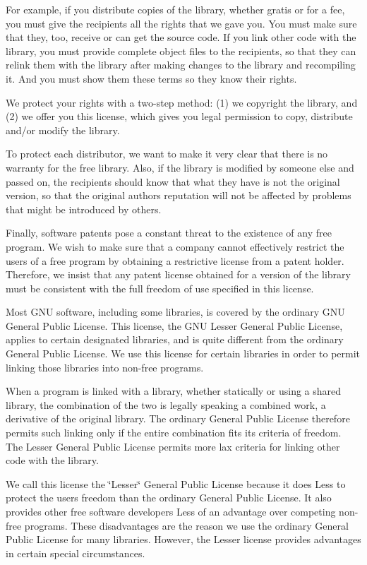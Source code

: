 For example, if you distribute copies of the library, whether gratis or for a fee, you must give the recipients all the rights that we gave you. You must make sure that they, too, receive or can get the source code. If you link other code with the library, you must provide complete object files to the recipients, so that they can relink them with the library after making changes to the library and recompiling it. And you must show them these terms so they know their rights.

We protect your rights with a two-\/step method\+: (1) we copyright the library, and (2) we offer you this license, which gives you legal permission to copy, distribute and/or modify the library.

To protect each distributor, we want to make it very clear that there is no warranty for the free library. Also, if the library is modified by someone else and passed on, the recipients should know that what they have is not the original version, so that the original author\textquotesingle{}s reputation will not be affected by problems that might be introduced by others.

Finally, software patents pose a constant threat to the existence of any free program. We wish to make sure that a company cannot effectively restrict the users of a free program by obtaining a restrictive license from a patent holder. Therefore, we insist that any patent license obtained for a version of the library must be consistent with the full freedom of use specified in this license.

Most G\+N\+U software, including some libraries, is covered by the ordinary G\+N\+U General Public License. This license, the G\+N\+U Lesser General Public License, applies to certain designated libraries, and is quite different from the ordinary General Public License. We use this license for certain libraries in order to permit linking those libraries into non-\/free programs.

When a program is linked with a library, whether statically or using a shared library, the combination of the two is legally speaking a combined work, a derivative of the original library. The ordinary General Public License therefore permits such linking only if the entire combination fits its criteria of freedom. The Lesser General Public License permits more lax criteria for linking other code with the library.

We call this license the \char`\"{}\+Lesser\char`\"{} General Public License because it does Less to protect the user\textquotesingle{}s freedom than the ordinary General Public License. It also provides other free software developers Less of an advantage over competing non-\/free programs. These disadvantages are the reason we use the ordinary General Public License for many libraries. However, the Lesser license provides advantages in certain special circumstances.

